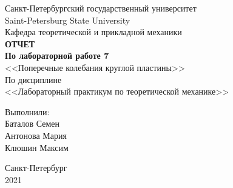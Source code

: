 \documentclass[12pt, a4paper]{article}
\begin{document}
    
    \begin{center}
        \large{Санкт-Петербургский государственный университет} \\
        \large{Saint-Petersburg State University}\\
        \hfill \break
        \hfill \break
        \hfill \break
        \hfill \break
        \hfill \break
        \hfill \break
        \hfill \break
        \large{Кафедра теоретической и прикладной механики} \\
        \hfill \break
        \hfill \break
        \large{\textbf{ОТЧЕТ}} \\
        \large{\textbf{По лабораторной работе 7}} \\
        \large{<<Поперечные колебания круглой пластины>>} \\
        \hfill \break
        \hfill \break
        \hfill \break
        \large{По дисциплине} \\
        \large{<<Лабораторный практикум по теоретической механике>>} \\
    \end{center}
    
    \hfill \break
    \hfill \break
    \hfill \break
    \hfill \break
    \hfill \break
    \hfill \break
    \hfill \break
    
    \begin{flushleft} 
        \large{Выполнили:} \\
        \large{Баталов Семен} \\
        \large{Антонова Мария} \\
        \large{Клюшин Максим} \\
    \end{flushleft}
    
    \hfill \break
    \hfill \break
    \hfill \break
    \hfill \break
    
    \begin{center} 
        \large{Санкт-Петербург} \\
        \large{2021} \\
    \end{center}
    
    \thispagestyle{empty}
    \newpage
    
\end{document}
